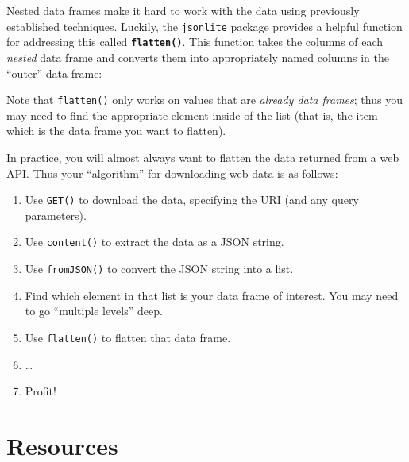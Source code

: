 \documentclass[]{book}
\newenvironment{Shaded}{\begin{snugshade}}{\end{snugshade}}
\newcommand{\KeywordTok}[1]{\textcolor[rgb]{0.13,0.29,0.53}{\textbf{#1}}}
\newcommand{\StringTok}[1]{\textcolor[rgb]{0.31,0.60,0.02}{#1}}
\newcommand{\CommentTok}[1]{\textcolor[rgb]{0.56,0.35,0.01}{\textit{#1}}}
\newcommand{\OperatorTok}[1]{\textcolor[rgb]{0.81,0.36,0.00}{\textbf{#1}}}
\newcommand{\NormalTok}[1]{#1}
\providecommand{\tightlist}{%
  \setlength{\itemsep}{0pt}\setlength{\parskip}{0pt}}
\theoremstyle{definition}
\theoremstyle{definition}
\theoremstyle{remark}
\begin{document}
Nested data frames make it hard to work with the data using previously
established techniques. Luckily, the \texttt{jsonlite} package provides
a helpful function for addressing this called
\textbf{\texttt{flatten()}}. This function takes the columns of each
\emph{nested} data frame and converts them into appropriately named
columns in the ``outer'' data frame:

\begin{Shaded}
\end{Shaded}

Note that \texttt{flatten()} only works on values that are \emph{already
data frames}; thus you may need to find the appropriate element inside
of the list (that is, the item which is the data frame you want to
flatten).

In practice, you will almost always want to flatten the data returned
from a web API. Thus your ``algorithm'' for downloading web data is as
follows:

\begin{enumerate}
\def\labelenumi{\arabic{enumi}.}
\tightlist
\item
  Use \texttt{GET()} to download the data, specifying the URI (and any
  query parameters).
\item
  Use \texttt{content()} to extract the data as a JSON string.
\item
  Use \texttt{fromJSON()} to convert the JSON string into a list.
\item
  Find which element in that list is your data frame of interest. You
  may need to go ``multiple levels'' deep.
\item
  Use \texttt{flatten()} to flatten that data frame.
\item
  \ldots{}
\item
  Profit!
\end{enumerate}

\section*{Resources}\label{resources-10}
\end{document}
